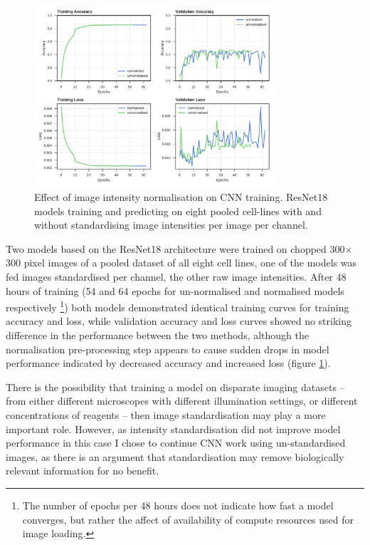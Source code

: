 \documentclass[a4paper,11pt,twoside,openright]{scrbook}
\begin{document}
\begin{figure}
    \includegraphics[width=0.8\textwidth]{ch2imgNorm}
    \captionsetup{width=0.8\textwidth}
    \caption[Effect of image intensity normalisation on CNN training]{Effect of image intensity normalisation on CNN 
training. ResNet18 models training and predicting on eight pooled cell-lines with and without standardising image 
intensities per image per channel.}
    \label{figure:img_norm}
\end{figure}

Two models based on the ResNet18 architecture were trained on chopped 300$\times$300 pixel images of a pooled dataset 
of all eight cell lines, one of the models was fed images standardised per channel, the other raw image intensities.
After 48 hours of training (54 and 64 epochs for un-normalised and normalised models respectively \footnote{The number 
of epochs per 48 hours does not indicate how fast a model converges, but rather the affect of availability of compute 
resources used for image loading.}) both models demonstrated identical training curves for training accuracy and loss, 
while validation accuracy and loss curves showed no striking difference in the performance between the two methods, 
although the normalisation pre-processing step appears to cause sudden drops in model performance indicated by 
decreased accuracy and increased loss (figure \ref{figure:img_norm}).

There is the possibility that training a model on disparate imaging datasets -- from either different microscopes with 
different illumination settings, or different concentrations of reagents -- then image standardisation may play a more 
important role.
However, as intensity standardisation did not improve model performance in this case I chose to continue CNN work using 
un-standardised images, as there is an argument that standardisation may remove biologically relevant information for 
no benefit.
\end{document}
